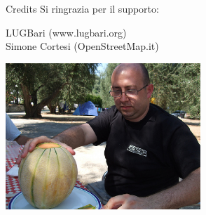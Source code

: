 \documentclass[slidestop,compress,red,notes,xcolor=dvipsnames]{beamer}	%
\begin{document}
        \begin{frame}{Credits}
            Si ringrazia per il supporto:\\
            \begin{center}
                LUGBari (www.lugbari.org)\\
                Simone Cortesi (OpenStreetMap.it)\\
            \end{center}
            \begin{center}
                \includegraphics[height=5.5cm]{images/simone.eps}
            \end{center}
        \end{frame}
\end{document}
